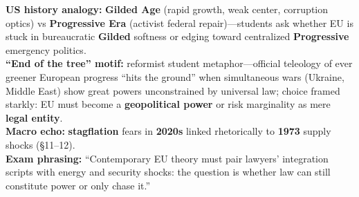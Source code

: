 \documentclass[10pt,a4paper]{article}
\begin{document}
{\textbf{US history analogy:} \textbf{Gilded Age} (rapid growth, weak center, corruption optics) vs \textbf{Progressive Era} (activist federal repair)---students ask whether EU is stuck in bureaucratic \textbf{Gilded} softness or edging toward centralized \textbf{Progressive} emergency politics.\\
\textbf{``End of the tree'' motif:} reformist student metaphor---official teleology of ever greener European progress ``hits the ground'' when simultaneous wars (Ukraine, Middle East) show great powers unconstrained by universal law; choice framed starkly: EU must become a \textbf{geopolitical power} or risk marginality as mere \textbf{legal entity}.\\
\textbf{Macro echo:} \textbf{stagflation} fears in \textbf{2020s} linked rhetorically to \textbf{1973} supply shocks (\S 11--12).\\
\textbf{Exam phrasing:} ``Contemporary EU theory must pair lawyers' integration scripts with energy and security shocks: the question is whether law can still constitute power or only chase it.''
}
\end{document}
